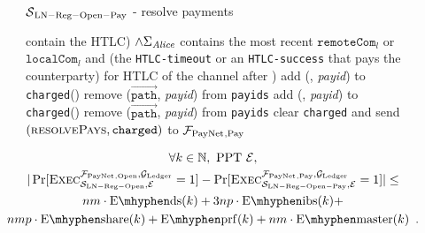 \begin{figure}[H]
\begin{simulatorbox}{$\mathcal{S}{}_{\mathrm{LN - Reg - Open - Pay}}$ - resolve
  payments}
\begin{algorithmic}[1]
{              contain the HTLC) $\wedge \Sigma_{\mathit{Alice}}$ contains the most
              recent $\mathtt{remoteCom}_l$ or $\mathtt{localCom}_l$ and (the
              \texttt{HTLC-timeout} or an \texttt{HTLC-success} that pays the
              counterparty) for HTLC of the channel after \alice{})}
              \label{alg:sim:resolvepay:negligent}
                \State add (\alice, \textit{payid}) to \texttt{charged}(\alice)
                \State remove ($\overrightarrow{\mathtt{path}}$, \textit{payid})
                from \texttt{payids}
              \label{alg:sim:resolvepay:honest}
                \State add (\alice, \textit{payid}) to \texttt{charged}(\alice)
                \State remove ($\overrightarrow{\mathtt{path}}$, \textit{payid})
                from \texttt{payids}
              \EndIf
            \EndFor
          \EndFor
          \label{alg:sim:resolvepay:loopend}
        \EndIf
        \State clear \texttt{charged} and send $\left(\textsc{resolvePays},
        \mathtt{charged}\right)$ to $\mathcal{F}_{\mathrm{PayNet}}{}_{\mathrm{, Pay}}$
      \EndIndent
    \end{algorithmic}
  \end{simulatorbox}
  \caption{}
  \label{alg:sim:resolvepay}
\end{figure}

\begin{lemma}
  \label{lemma:pay}
  \begin{gather*}
    \forall k \in \mathbb{N}, \text{ PPT } \environment, \\
    |\Pr[\textsc{Exec}^{\fpaynet{}_{\mathrm{, Open}},
    \ledger}_{\simulator_{\mathrm{LN - Reg - Open}}, \environment} = 1] -
    \Pr[\textsc{Exec}^{\fpaynet{}_{\mathrm{, Pay}},
    \ledger}_{\simulator_{\mathrm{LN - Reg - Open - Pay}}, \environment} = 1]|
    \leq \\
    nm \cdot \mathrm{E \mhyphen ds}(k) + 3np \cdot \mathrm{E \mhyphen ibs}(k) +
    \\
    nmp \cdot \mathrm{E \mhyphen share}(k) + \mathrm{E \mhyphen prf}(k) + nm
    \cdot \mathrm{E \mhyphen master}(k) \enspace.
  \end{gather*}
\end{lemma}

